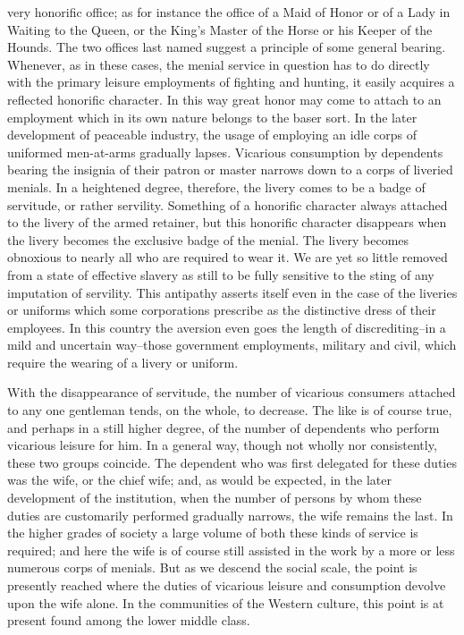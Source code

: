 \documentclass[12pt]{report}
\begin{document}
very honorific office; as for instance the office of a Maid of Honor or
of a Lady in Waiting to the Queen, or the King's Master of the Horse or
his Keeper of the Hounds. The two offices last named suggest a principle
of some general bearing. Whenever, as in these cases, the menial service
in question has to do directly with the primary leisure employments
of fighting and hunting, it easily acquires a reflected honorific
character. In this way great honor may come to attach to an employment
which in its own nature belongs to the baser sort. In the later
development of peaceable industry, the usage of employing an idle corps
of uniformed men-at-arms gradually lapses. Vicarious consumption by
dependents bearing the insignia of their patron or master narrows down
to a corps of liveried menials. In a heightened degree, therefore, the
livery comes to be a badge of servitude, or rather servility. Something
of a honorific character always attached to the livery of the armed
retainer, but this honorific character disappears when the livery
becomes the exclusive badge of the menial. The livery becomes obnoxious
to nearly all who are required to wear it. We are yet so little removed
from a state of effective slavery as still to be fully sensitive to the
sting of any imputation of servility. This antipathy asserts itself
even in the case of the liveries or uniforms which some corporations
prescribe as the distinctive dress of their employees. In this country
the aversion even goes the length of discrediting--in a mild and
uncertain way--those government employments, military and civil, which
require the wearing of a livery or uniform.

With the disappearance of servitude, the number of vicarious consumers
attached to any one gentleman tends, on the whole, to decrease. The like
is of course true, and perhaps in a still higher degree, of the number
of dependents who perform vicarious leisure for him. In a general way,
though not wholly nor consistently, these two groups coincide. The
dependent who was first delegated for these duties was the wife, or the
chief wife; and, as would be expected, in the later development of
the institution, when the number of persons by whom these duties are
customarily performed gradually narrows, the wife remains the last.
In the higher grades of society a large volume of both these kinds of
service is required; and here the wife is of course still assisted in
the work by a more or less numerous corps of menials. But as we descend
the social scale, the point is presently reached where the duties of
vicarious leisure and consumption devolve upon the wife alone. In the
communities of the Western culture, this point is at present found among
the lower middle class.
\end{document}

